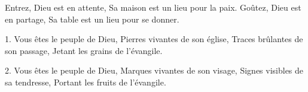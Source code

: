 Entrez, Dieu est en attente,
Sa maison est un lieu pour la paix.
Goûtez, Dieu est en partage,
Sa table est un lieu pour se donner.

1.
Vous êtes le peuple de Dieu,
Pierres vivantes de son église,
Traces brûlantes de son passage,
Jetant les grains de l'évangile.

2.
Vous êtes le peuple de Dieu,
Marques vivantes de son visage,
Signes visibles de sa tendresse,
Portant les fruits de l'évangile.

